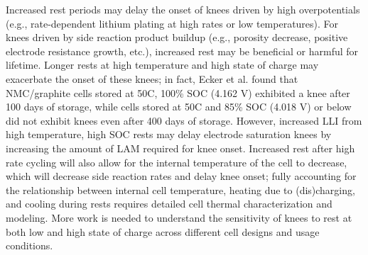 \documentclass[journal=jpclcd,manuscript=article]{achemso}
\begin{document}
Increased rest periods may delay the onset of knees driven by high overpotentials (e.g., rate-dependent lithium plating at high rates or low temperatures).
For knees driven by side reaction product buildup (e.g., porosity decrease, positive electrode resistance growth, etc.), increased rest may be beneficial or harmful for lifetime.
Longer rests at high temperature and high state of charge may exacerbate the onset of these knees; in fact, Ecker et al.\cite{ecker_calendar_2014} found that NMC/graphite cells stored at 50\degree C, 100\% SOC (4.162 V) exhibited a knee after 100 days of storage, while cells stored at 50\degree C and  85\% SOC (4.018 V) or below did not exhibit knees even after 400 days of storage.
However, increased LLI from high temperature, high SOC rests may delay electrode saturation knees by increasing the amount of LAM required for knee onset.\cite{mao_calendar_2017, uddin_viability_2018}
Increased rest after high rate cycling will also allow for the internal temperature of the cell to decrease, which will decrease side reaction rates and delay knee onset; fully accounting for the relationship between internal cell temperature, heating due to (dis)charging, and cooling during rests requires detailed cell thermal characterization and modeling.
More work is needed to understand the sensitivity of knees to rest at both low and high state of charge across different cell designs and usage conditions.
\end{document}
